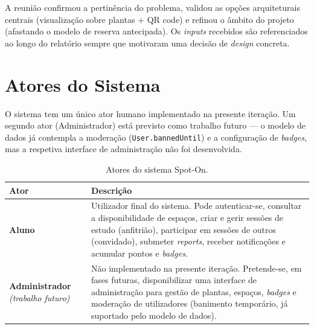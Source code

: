 \documentclass[11pt,a4paper]{article}
\begin{document}
A reunião confirmou a pertinência do problema, validou as opções
arquiteturais centrais (visualização sobre plantas + QR code) e refinou o
âmbito do projeto (afastando o modelo de reserva antecipada). Os \emph{inputs}
recebidos são referenciados ao longo do relatório sempre que motivaram uma
decisão de \emph{design} concreta.

\section{Atores do Sistema}

O sistema tem um único ator humano implementado na presente iteração. Um
segundo ator (Administrador) está previsto como trabalho futuro --- o modelo
de dados já contempla a moderação (\texttt{User.bannedUntil}) e a configuração
de \emph{badges}, mas a respetiva interface de administração não foi
desenvolvida.

\begin{table}[h!]
    \centering
    \renewcommand{\arraystretch}{1.3}
    \begin{tabularx}{\linewidth}{@{}lX@{}}
        \toprule
        \textbf{Ator}                              & \textbf{Descrição}                                                                                                                                                                                                                                                            \\
        \midrule
        \textbf{Aluno}                             &
        Utilizador final do sistema. Pode autenticar-se, consultar a disponibilidade
        de espaços, criar e gerir sessões de estudo (anfitrião), participar em sessões
        de outros (convidado), submeter \emph{reports}, receber notificações e
        acumular pontos e \emph{badges}.                                                                                                                                                                                                                                                                                       \\
        \textbf{Administrador} \newline \emph{(trabalho futuro)} &
        Não implementado na presente iteração. Pretende-se, em fases futuras,
        disponibilizar uma interface de administração para gestão de plantas,
        espaços, \emph{badges} e moderação de utilizadores (banimento
        temporário, já suportado pelo modelo de dados).                                                                                                                                                                                                                                                                       \\
        \bottomrule
    \end{tabularx}
    \caption{Atores do sistema Spot-On.}
\end{table}
\end{document}
